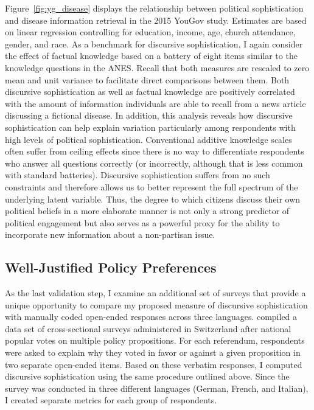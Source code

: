 Figure~\ref{fig:yg_disease} displays the relationship between political sophistication and disease information retrieval in the 2015 YouGov study. Estimates are based on linear regression controlling for education, income, age, church attendance, gender, and race. As a benchmark for discursive sophistication, I again consider the effect of factual knowledge based on a battery of eight items similar to the knowledge questions in the ANES. Recall that both measures are rescaled to zero mean and unit variance to facilitate direct comparisons between them. Both discursive sophistication as well as factual knowledge are positively correlated with the amount of information individuals are able to recall from a news article discussing a fictional disease. In addition, this analysis reveals how discursive sophistication can help explain variation particularly among respondents with high levels of political sophistication. Conventional additive knowledge scales often suffer from ceiling effects since there is no way to differentiate respondents who answer all questions correctly (or incorrectly, although that is less common with standard batteries). Discursive sophistication suffers from no such constraints and therefore allows us to better represent the full spectrum of the underlying latent variable. Thus, the degree to which citizens discuss their own political beliefs in a more elaborate manner is not only a strong predictor of political engagement but also serves as a powerful proxy for the ability to incorporate new information about a non-partisan issue.


\subsection*{Well-Justified Policy Preferences}
As the last validation step, I examine an additional set of surveys that provide a unique opportunity to compare my proposed measure of discursive sophistication with manually coded open-ended responses across three languages.  \citet{colombo2016justifications} compiled a data set of cross-sectional surveys administered in Switzerland after national popular votes on multiple policy propositions. For each referendum, respondents were asked to explain why they voted in favor or against a given proposition in two separate open-ended items. Based on these verbatim responses, I computed discursive sophistication using the same procedure outlined above. Since the survey was conducted in three different languages (German, French, and Italian), I created separate metrics for each group of respondents.

